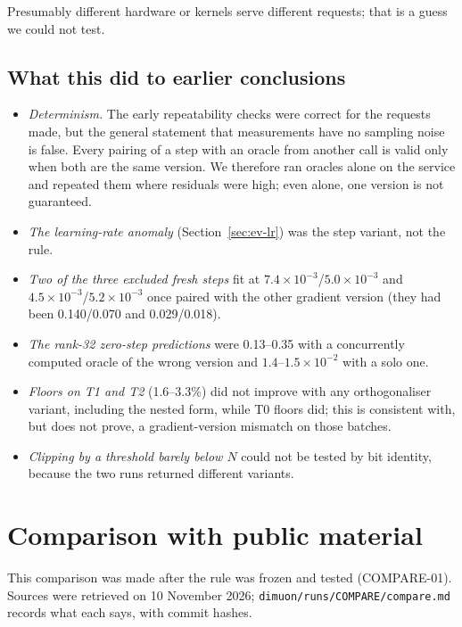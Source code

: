 \documentclass[11pt]{article}
\begin{document}
Presumably different hardware or kernels serve different requests; that is a guess we could not test.

\subsection{What this did to earlier conclusions}
\begin{itemize}
\item \emph{Determinism.} The early repeatability checks were correct for the requests made, but the
general statement that measurements have no sampling noise is false. Every pairing of a step with
an oracle from another call is valid only when both are the same version. We therefore ran oracles
alone on the service and repeated them where residuals were high; even alone, one version is not
guaranteed.
\item \emph{The learning-rate anomaly} (Section~\ref{sec:ev-lr}) was the step variant, not the rule.
\item \emph{Two of the three excluded fresh steps} fit at $7.4\times10^{-3}$/$5.0\times10^{-3}$ and
$4.5\times10^{-3}$/$5.2\times10^{-3}$ once paired with the other gradient version (they had been
0.140/0.070 and 0.029/0.018).
\item \emph{The rank-32 zero-step predictions} were 0.13--0.35 with a concurrently computed oracle of
the wrong version and $1.4$--$1.5\times10^{-2}$ with a solo one.
\item \emph{Floors on T1 and T2} (1.6--3.3\%) did not improve with any orthogonaliser variant,
including the nested form, while T0 floors did; this is consistent with, but does not prove, a
gradient-version mismatch on those batches.
\item \emph{Clipping by a threshold barely below $N$} could not be tested by bit identity, because the
two runs returned different variants.
\end{itemize}

\section{Comparison with public material}\label{sec:compare}

This comparison was made after the rule was frozen and tested (COMPARE-01). Sources were retrieved on
10 November 2026; \texttt{dimuon/runs/COMPARE/compare.md} records what each says, with commit
hashes.
\end{document}

